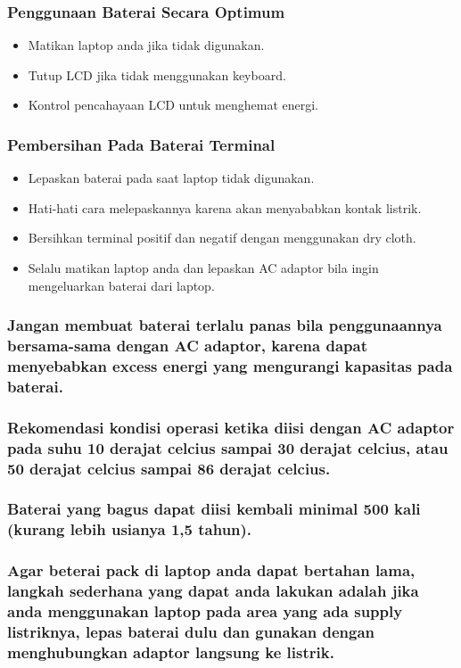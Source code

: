	\subsubsection{Penggunaan Baterai Secara Optimum}
	\begin{itemize}	
		\item{Matikan laptop anda jika tidak digunakan.}
		\item{Tutup LCD jika tidak menggunakan keyboard.}
		\item{Kontrol pencahayaan LCD untuk menghemat energi.}
	\end{itemize}	
	\subsubsection{Pembersihan Pada Baterai Terminal}
	\begin{itemize}	
		\item{Lepaskan baterai pada saat laptop tidak digunakan.}
		\item{Hati-hati cara melepaskannya karena akan menyababkan kontak listrik.}
		\item{Bersihkan terminal positif dan negatif dengan menggunakan dry cloth.}
		\item{Selalu matikan laptop anda dan lepaskan AC adaptor bila ingin mengeluarkan baterai dari laptop.}
	\end{itemize}
	\subsubsection{Jangan membuat baterai terlalu panas bila penggunaannya bersama-sama dengan AC adaptor, karena dapat 
	menyebabkan excess energi yang mengurangi kapasitas pada baterai.}
	\subsubsection{Rekomendasi kondisi operasi ketika diisi dengan AC adaptor pada suhu 10 derajat celcius sampai
	30 derajat celcius, atau 50 derajat celcius sampai 86 derajat celcius.}
	\subsubsection{Baterai yang bagus dapat diisi kembali minimal 500 kali (kurang lebih usianya 1,5 tahun).}
	\subsubsection{Agar beterai pack di laptop anda dapat bertahan lama, langkah sederhana yang dapat anda lakukan adalah jika
	anda menggunakan laptop pada area yang ada supply listriknya, lepas baterai dulu dan gunakan dengan menghubungkan adaptor 
	langsung ke listrik.}
	
